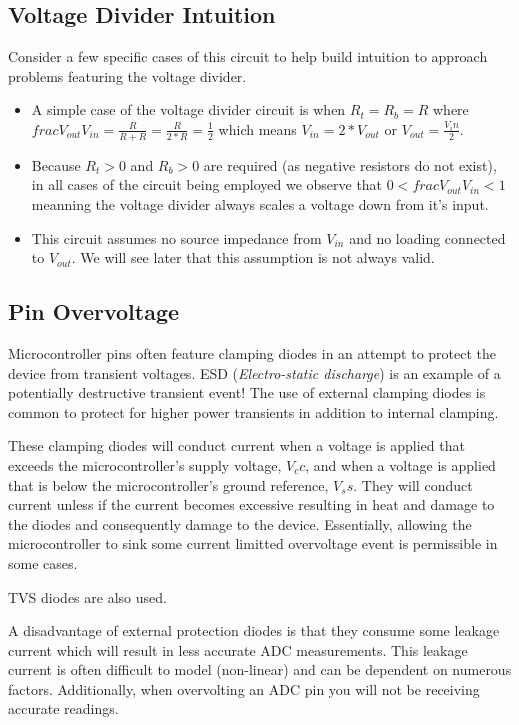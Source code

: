 \documentclass[main.tex]{subfiles}
\begin{document}
\subsection{Voltage Divider Intuition}
Consider a few specific cases of this circuit to help build intuition to approach problems featuring the voltage divider.
\begin{itemize}
    \item A simple case of the voltage divider circuit is when $R_t = R_b = R$ where $frac{V_{out}}{V_{in}} = \frac{R}{R+R} = \frac{R}{2*R} = \frac{1}{2}$ which means $V_{in} = 2 * V_{out}$ or $V_{out} = \frac{V_in}{2}$.
    \item Because $R_t > 0$ and $R_b > 0$ are required (as negative resistors do not exist), in all cases of the circuit being employed we observe that $0 < frac{V_{out}}{V_{in}} < 1$ meanning the voltage divider always scales a voltage down from it's input. 
    \item This circuit assumes no source impedance from $V_{in}$ and no loading connected to $V_{out}$. We will see later that this assumption is not always valid. 
\end{itemize}

\subsection{Pin Overvoltage}
Microcontroller pins often feature clamping diodes in an attempt to protect the device from transient voltages. ESD (\textit{Electro-static discharge}) is an example of a potentially destructive transient event! The use of external clamping diodes is common to protect for higher power transients in addition to internal clamping. 


These clamping diodes will conduct current when a voltage is applied that exceeds the microcontroller's supply voltage, $V_cc$, and when a voltage is applied that is below the microcontroller's ground reference, $V_ss$. They will conduct current unless if the current becomes excessive resulting in heat and damage to the diodes and consequently damage to the device. Essentially, allowing the microcontroller to sink some current limitted overvoltage event is permissible in some cases. 

TVS diodes are also used. 

A disadvantage of external protection diodes is that they consume some leakage current which will result in less accurate ADC measurements. This leakage current is often difficult to model (non-linear) and can be dependent on numerous factors. Additionally, when overvolting an ADC pin you will not be receiving accurate readings.
\end{document}
